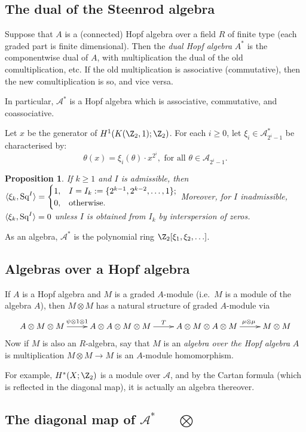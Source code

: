 \documentclass[11pt]{article}
\newcommand{\Squ}{\textup{Sq}}
\theoremstyle{plain}
\newtheorem*{prop*}{Proposition}
\theoremstyle{definition}
\renewcommand{\to}{\longrightarrow}
\newcommand{\Steen}{\mathscr{A}}
\begin{document}
\subsection{The dual of the Steenrod algebra}
Suppose that $A$ is a (connected) Hopf algebra over a field $R$ of finite type (each graded part is finite dimensional). Then the \emph{dual Hopf algebra} $A^*$ is the componentwise dual of $A$, with multiplication the dual of the old comultiplication, etc. If the old multiplication is associative (commutative), then the new comultiplication is so, and vice versa.

In particular, $\Steen^*$ is a Hopf algebra which is associative, commutative, and coassociative.

Let $x$ be the generator of $H^1(K(\Z_2,1);\Z_2)$. For each $i\geq0$, let $\xi_i\in\Steen^*_{2^i-1}$ be characterised by:
\[\theta(x)=\xi_i(\theta)\cdot x^{2^i},\text{ for all }\theta\in\Steen_{2^i-1}.\]
\begin{prop*}
If $k\geq1$ and $I$ is admissible, then $\langle\xi_k,\Squ^I\rangle=\begin{cases}1,&I=I_k:=\{2^{k-1},2^{k-2},\ldots,1\};\\0,&\textup{otherwise.}\end{cases}$ Moreover, for $I$ inadmissible, $\langle\xi_k,\Squ^I\rangle=0$ unless $I$ is obtained from $I_k$ by interspersion of zeros.
\end{prop*}
As an algebra, $\Steen^*$ is the polynomial ring $\Z_2[\xi_1,\xi_2,\ldots]$.

\subsection{Algebras over a Hopf algebra}
If $A$ is a Hopf algebra and $M$ is a graded $A$-module (i.e.\ $M$ is a module of the algebra $A$), then $M\otimes M$ has a natural structure of graded $A$-module via
\[\xymatrix{
A\otimes M\otimes M\ar[r]^{\psi\otimes1\otimes1\ \ \ }&A\otimes A\otimes M\otimes M\ar[r]^T&A\otimes M\otimes A\otimes M\ar[r]^{\qquad\mu\otimes \mu\ }&M\otimes M
}\]
Now if $M$ is also an $R$-algebra, say that $M$ is an \emph{algebra over the Hopf algebra} $A$ is multiplication $M\otimes M\to M$ is an $A$-module homomorphism.

For example, $H^*(X;\Z_2)$ is a module over $\Steen$, and by the Cartan formula (which is reflected in the diagonal map), it is actually an algebra thereover.
\subsection{The diagonal map of \texorpdfstring{$\Steen^*$\ \ \ $\bigotimes$}{A}}
\end{document}
